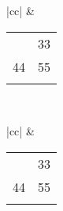 \documentclass{book}
\begin{document}
\centering

\begin{tabular}{|cc|} & \begin{tabular}[t]{|c|c|}\firsthline
     22 & 33 \\
     44 & 55 \\ \lasthline
     \end{tabular}\\ \hline
\end{tabular}
{\extratabsurround=5pt
\begin{tabular}{|cc|}  & \begin{tabular}[t]{|c|c|}\firsthline
     22 & 33 \\
     44 & 55 \\ \lasthline
     \end{tabular}\\ \hline
\end{tabular}}
\end{document}
